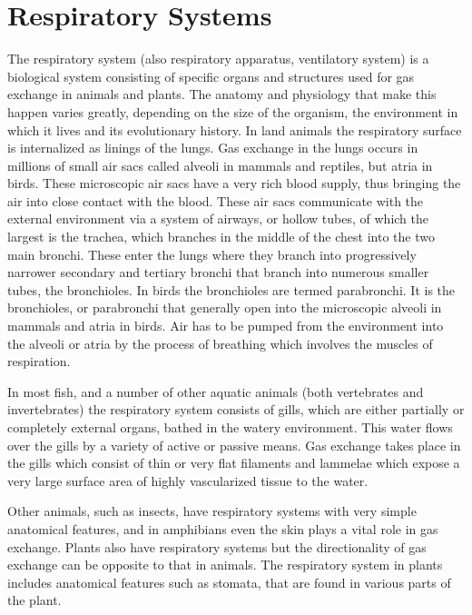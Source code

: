 \hypertarget{respiratory-systems}{%
\chapter{Respiratory Systems}\label{respiratory-systems}}

The respiratory system (also respiratory apparatus, ventilatory system) is a biological system consisting of specific organs and structures used for gas exchange in animals and plants. The anatomy and physiology that make this happen varies greatly, depending on the size of the organism, the environment in which it lives and its evolutionary history. In land animals the respiratory surface is internalized as linings of the lungs. Gas exchange in the lungs occurs in millions of small air sacs called alveoli in mammals and reptiles, but atria in birds. These microscopic air sacs have a very rich blood supply, thus bringing the air into close contact with the blood. These air sacs communicate with the external environment via a system of airways, or hollow tubes, of which the largest is the trachea, which branches in the middle of the chest into the two main bronchi. These enter the lungs where they branch into progressively narrower secondary and tertiary bronchi that branch into numerous smaller tubes, the bronchioles. In birds the bronchioles are termed parabronchi. It is the bronchioles, or parabronchi that generally open into the microscopic alveoli in mammals and atria in birds. Air has to be pumped from the environment into the alveoli or atria by the process of breathing which involves the muscles of respiration.

In most fish, and a number of other aquatic animals (both vertebrates and invertebrates) the respiratory system consists of gills, which are either partially or completely external organs, bathed in the watery environment. This water flows over the gills by a variety of active or passive means. Gas exchange takes place in the gills which consist of thin or very flat filaments and lammelae which expose a very large surface area of highly vascularized tissue to the water.

Other animals, such as insects, have respiratory systems with very simple anatomical features, and in amphibians even the skin plays a vital role in gas exchange. Plants also have respiratory systems but the directionality of gas exchange can be opposite to that in animals. The respiratory system in plants includes anatomical features such as stomata, that are found in various parts of the plant.

